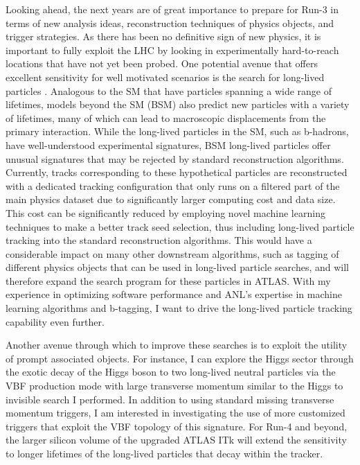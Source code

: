 \documentclass[a4paper]{article}
\begin{document}
Looking ahead, the next years are of great importance to prepare for Run-3 in terms of new analysis ideas, reconstruction techniques of physics objects, and trigger strategies. As there has been no definitive sign of new physics,
it is important to fully exploit the LHC by looking in experimentally hard-to-reach locations that have not yet been probed.
One potential avenue that offers excellent sensitivity for well motivated scenarios is the search for long-lived particles
\cite{alimena2019searching}.
Analogous to the SM that have particles spanning a wide range of lifetimes, models beyond the SM (BSM) also predict new particles
with a variety of lifetimes, many of which can lead to macroscopic displacements from the primary interaction.
While the long-lived particles in the SM, such as b-hadrons, have well-understood experimental signatures, BSM long-lived particles
offer unusual signatures that may be rejected by standard reconstruction algorithms.
Currently, tracks corresponding to these hypothetical particles are reconstructed with a dedicated tracking configuration that only runs
on a filtered part of the main physics dataset due to significantly larger computing cost and data size. This cost can be significantly reduced
by employing novel machine learning techniques to make a better track seed selection, thus including long-lived particle tracking
into the standard reconstruction algorithms. This would have a considerable impact on many other downstream algorithms, such as tagging of different
physics objects that can be used in long-lived particle searches, and will therefore expand the search program for these particles in ATLAS.
With my experience in optimizing software performance and ANL's expertise in machine learning algorithms and b-tagging,
I want to drive the long-lived particle tracking capability even further.

Another avenue through which to improve these searches is to exploit the utility of prompt associated objects.
For instance, I can explore the Higgs sector through the exotic decay of the Higgs boson to two long-lived neutral particles via the VBF production mode with large transverse momentum similar to the Higgs to invisible search I performed. In addition to using standard missing transverse momentum triggers, I am interested in investigating the use of more customized triggers that exploit the VBF topology of this signature.
For Run-4 and beyond, the larger silicon volume of the upgraded ATLAS ITk will extend the sensitivity to longer lifetimes of the long-lived particles that decay within the tracker\cite{HLLHC_vertex}.
\end{document}
